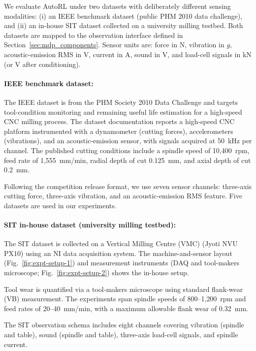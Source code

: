 \documentclass[sn-basic]{sn-jnl} %
\begin{document}
We evaluate AutoRL under two datasets with deliberately different sensing modalities: (i) an IEEE benchmark dataset (public PHM 2010 data challenge), and (ii) an in-house SIT dataset collected on a university milling testbed. Both datasets are mapped to the observation interface defined in Section~\ref{sec:mdp_components}. Sensor units are: force in N, vibration in $g$, acoustic-emission RMS in V, current in A, sound in V, and load-cell signals in kN (or V after conditioning).

\paragraph{IEEE benchmark dataset:}
The IEEE dataset \cite{PHMdata2010} is from the PHM Society 2010 Data Challenge and targets tool-condition monitoring and remaining useful life estimation for a high-speed CNC milling process. The dataset documentation reports a high-speed CNC platform instrumented with a dynamometer (cutting forces), accelerometers (vibrations), and an acoustic-emission sensor, with signals acquired at 50~kHz per channel. The published cutting conditions include a spindle speed of 10{,}400~rpm, feed rate of 1{,}555~mm/min, radial depth of cut 0.125~mm, and axial depth of cut 0.2~mm.

Following the competition release format, we use seven sensor channels: three-axis cutting force, three-axis vibration, and an acoustic-emission RMS feature. Five datasets are used in our experiments.

\paragraph{SIT in-house dataset (university milling testbed):}
The SIT dataset is collected on a Vertical Milling Centre (VMC) (Jyoti NVU PX10) using an NI data acquisition system. The machine-and-sensor layout (Fig.~\ref{fig:expt-setup-1}) and measurement instruments (DAQ and tool-makers microscope; Fig.~\ref{fig:expt-setup-2}) shows the in-house setup.

Tool wear is quantified via a tool-makers microscope using standard flank-wear (VB) measurement. The experiments span spindle speeds of 800--1{,}200~rpm and feed rates of 20--40~mm/min, with a maximum allowable flank wear of 0.32~mm.

The SIT observation schema includes eight channels covering vibration (spindle and table), sound (spindle and table), three-axis load-cell signals, and spindle current.
\end{document}
